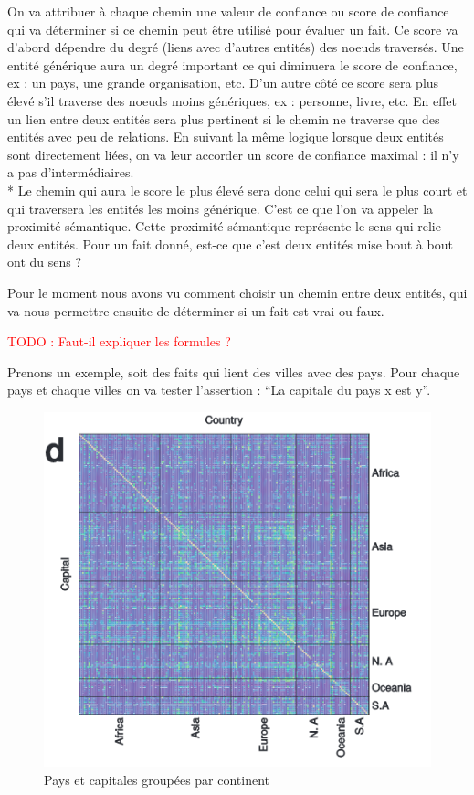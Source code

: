 \documentclass[12pt]{article}
\newcommand\todo[1]{\textcolor{red}{TODO : #1}}
\begin{document}

On va attribuer à chaque chemin une valeur de confiance ou score de confiance qui va déterminer si ce chemin peut être utilisé pour évaluer un fait. Ce score va d'abord dépendre du degré (liens avec d'autres entités) des noeuds traversés. Une entité générique aura un degré important ce qui diminuera le score de confiance, ex : un pays, une grande organisation, etc. D'un autre côté ce score sera plus élevé s'il traverse des noeuds moins génériques, ex : personne, livre, etc. En effet un lien entre deux entités sera plus pertinent si le chemin ne traverse que des entités avec peu de relations. En suivant la même logique lorsque deux entités sont directement liées, on va leur accorder un score de confiance maximal : il n'y a pas d'intermédiaires.
\\*
Le chemin qui aura le score le plus élevé sera donc celui qui sera le plus court et qui traversera les entités les moins générique. C'est ce que l'on va appeler la proximité sémantique. Cette proximité sémantique représente le sens qui relie deux entités. Pour un fait donné, est-ce que c'est deux entités mise bout à bout ont du sens ? 

Pour le moment nous avons vu comment choisir un chemin entre deux entités, qui va nous permettre ensuite de déterminer si un fait est vrai ou faux. 

\todo{Faut-il expliquer les formules ?}

Prenons un exemple, soit des faits qui lient des villes avec des pays. Pour chaque pays et chaque villes on va tester l'assertion : \enquote{La capitale du pays x est y}.

\begin{figure}[h]
\centering
\includegraphics[draft=false, scale=0.5]{imgs/country_cap_check.PNG}
\caption{Pays et capitales groupées par continent}
\label{fig1}
\end{figure}
\end{document}
